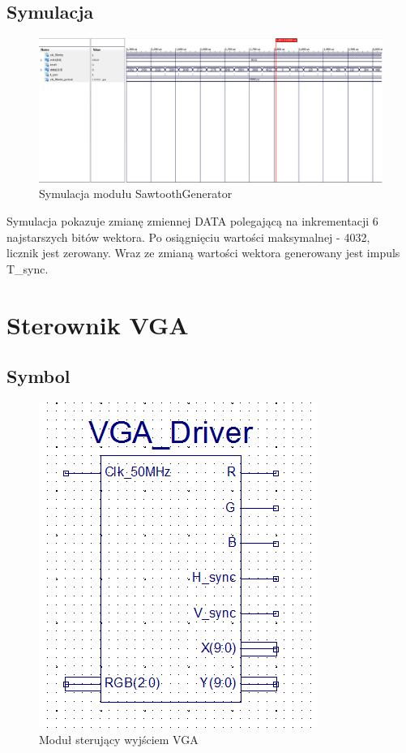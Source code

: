 \documentclass[a4paper]{report}
\begin{document}
		\begin{landscape}
			\subsection{Symulacja}
				\begin{figure}[h!]
					\centering
					\includegraphics[width=1.6\textwidth]{sawtooth_generator_symulacja2.png}
					\caption{Symulacja modułu SawtoothGenerator}
				\end{figure}
\justify Symulacja pokazuje zmianę zmiennej DATA polegającą na inkrementacji 6 najstarszych bitów wektora. Po osiągnięciu wartości maksymalnej - 4032,\\ licznik jest zerowany. Wraz ze zmianą wartości wektora generowany jest impuls T\_sync.
		\end{landscape}
		
		\newpage
	\section{Sterownik VGA}
		\subsection{Symbol}
			\begin{figure}[h!]
				\centering
				\includegraphics{vgadriver2.png}
				\caption{Moduł sterujący wyjściem VGA}
			\end{figure}
			
\end{document}
